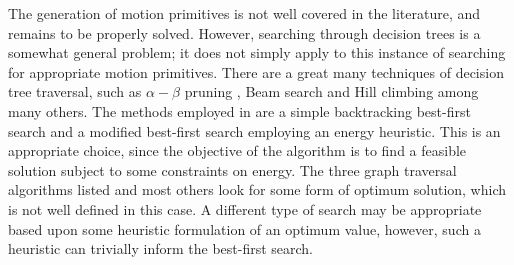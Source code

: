 The generation of motion primitives is not well covered in the literature, and remains to be properly solved. However, searching through decision trees is a somewhat general problem; it does not simply apply to this instance of searching for appropriate motion primitives. There are a great many techniques of decision tree traversal, such as $\alpha-\beta$ pruning \cite{knuth1976analysis}, Beam search \cite{steinbiss1994improvements} and Hill climbing \cite{goldfeld1966maximization} among many others. The methods employed in \cite{manchester13planning} are a simple backtracking best-first search and a modified best-first search employing an energy heuristic. This is an appropriate choice, since the objective of the algorithm is to find a feasible solution subject to some constraints on energy. The three graph traversal algorithms listed and most others look for some form of optimum solution, which is not well defined in this case. A different type of search may be appropriate based upon some heuristic formulation of an optimum value, however, such a heuristic can trivially inform the best-first search.